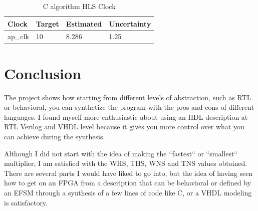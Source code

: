 \documentclass[]{IEEEtran}
\begin{document}
\begin{table}[]
	\centering
	\begin{tabular}{@{}llll@{}}
		\toprule
		Clock & Target & Estimated & Uncertainty  \\ \midrule
		ap\_clk      & 10       & 8.286     & 1.25      \\ \bottomrule
	\end{tabular}
	\caption{C algorithm HLS Clock}
	\label{tab:hls_clk}
\end{table}


	\section{Conclusion}
	The project shows how starting from different levels of abstraction, such as RTL or behavioral, you can synthetize the program with the pros and cons of different languages. I found myself more enthusiastic about using an HDL description at RTL Verilog and VHDL level because it gives you more control over what you can achieve during the synthesis. 
	
	Although I did not start with the idea of making the ``fastest`` or ``smallest`` multiplier, I am satisfied with the WHS, THS, WNS and TNS values obtained. There are several parts I would have liked to go into, but the idea of having seen how to get on an FPGA from a description that can be behavioral or defined by an EFSM through a synthesis of a few lines of code like C, or a VHDL modeling is satisfactory.
	
	
	
\end{document}
